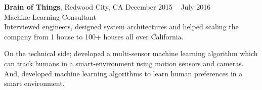 \textbf{Brain of Things}, Redwood City, CA \hfill December 2015 \textendash ~ July 2016\vspace{0mm}\\\vspace{0mm}
\hspace{-1.5mm} Machine Learning Consultant  \hfill \vspace{-5mm} \\

Interviewed engineers, designed system architectures and helped scaling the company from 1 house to 100+ houses all over California. 

\newpage

On the technical side; developed a multi-sensor machine learning algorithm which can track humans in a smart-environment using motion sensors and cameras. And, developed machine learning algorithms to learn human preferences in a smart environment.